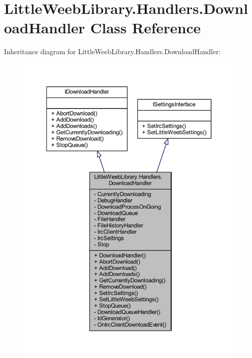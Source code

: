\hypertarget{class_little_weeb_library_1_1_handlers_1_1_download_handler}{}\section{Little\+Weeb\+Library.\+Handlers.\+Download\+Handler Class Reference}
\label{class_little_weeb_library_1_1_handlers_1_1_download_handler}


Inheritance diagram for Little\+Weeb\+Library.\+Handlers.\+Download\+Handler\+:\nopagebreak
\begin{figure}[H]
\begin{center}
\leavevmode
\includegraphics[width=350pt]{class_little_weeb_library_1_1_handlers_1_1_download_handler__inherit__graph}
\end{center}
\end{figure}


